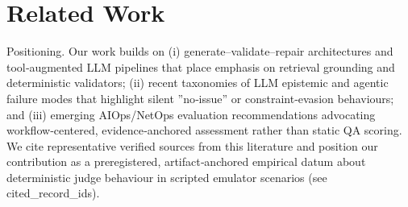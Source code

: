 \documentclass[conference]{IEEEtran}
\begin{document}
\section{Related Work}
Positioning. Our work builds on (i) generate--validate--repair architectures and tool‑augmented LLM pipelines that place emphasis on retrieval grounding and deterministic validators; (ii) recent taxonomies of LLM epistemic and agentic failure modes that highlight silent ''no‑issue'' or constraint‑evasion behaviours; and (iii) emerging AIOps/NetOps evaluation recommendations advocating workflow‑centered, evidence‑anchored assessment rather than static QA scoring. We cite representative verified sources from this literature and position our contribution as a preregistered, artifact‑anchored empirical datum about deterministic judge behaviour in scripted emulator scenarios (see cited\_record\_ids).
\end{document}
